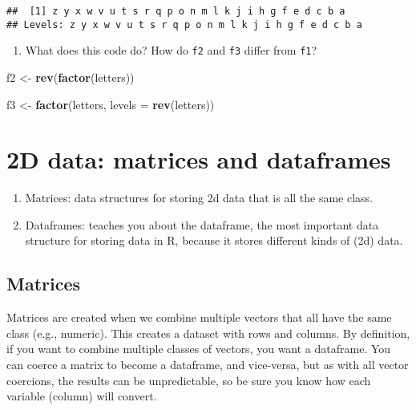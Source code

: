 \documentclass[
]{book}
\newenvironment{Shaded}{\begin{snugshade}}{\end{snugshade}}
\newcommand{\DataTypeTok}[1]{\textcolor[rgb]{0.13,0.29,0.53}{#1}}
\newcommand{\KeywordTok}[1]{\textcolor[rgb]{0.13,0.29,0.53}{\textbf{#1}}}
\newcommand{\NormalTok}[1]{#1}
\newcommand{\StringTok}[1]{\textcolor[rgb]{0.31,0.60,0.02}{#1}}
\providecommand{\tightlist}{%
  \setlength{\itemsep}{0pt}\setlength{\parskip}{0pt}}
\begin{document}
\begin{verbatim}
##  [1] z y x w v u t s r q p o n m l k j i h g f e d c b a
## Levels: z y x w v u t s r q p o n m l k j i h g f e d c b a
\end{verbatim}

\begin{enumerate}
\def\labelenumi{\arabic{enumi}.}
\setcounter{enumi}{1}
\tightlist
\item
  What does this code do? How do \texttt{f2} and \texttt{f3} differ from \texttt{f1}?
\end{enumerate}

\begin{Shaded}
\begin{Highlighting}[]
\NormalTok{f2 \textless{}{-}}\StringTok{ }\KeywordTok{rev}\NormalTok{(}\KeywordTok{factor}\NormalTok{(letters))}

\NormalTok{f3 \textless{}{-}}\StringTok{ }\KeywordTok{factor}\NormalTok{(letters, }\DataTypeTok{levels =} \KeywordTok{rev}\NormalTok{(letters))}
\end{Highlighting}
\end{Shaded}

\hypertarget{d-data-matrices-and-dataframes}{%
\section{2D data: matrices and dataframes}\label{d-data-matrices-and-dataframes}}

\begin{enumerate}
\def\labelenumi{\arabic{enumi}.}
\tightlist
\item
  Matrices: data structures for storing 2d data that is all the same class.
\item
  Dataframes: teaches you about the dataframe, the most important data structure for storing data in R, because it stores different kinds of (2d) data.
\end{enumerate}

\hypertarget{matrices}{%
\subsection{Matrices}\label{matrices}}

Matrices are created when we combine multiple vectors that all have the same class (e.g., numeric). This creates a dataset with rows and columns. By definition, if you want to combine multiple classes of vectors, you want a dataframe. You can coerce a matrix to become a dataframe, and vice-versa, but as with all vector coercions, the results can be unpredictable, so be sure you know how each variable (column) will convert.
\end{document}
